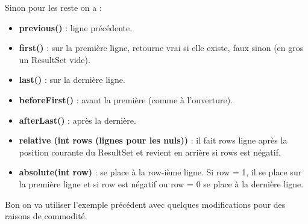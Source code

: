 \documentclass{report}
\begin{document}
Sinon pour les reste on a :
\begin{itemize}
\item \textbf{previous()} : ligne précédente.
\item \textbf{first()} : sur la première ligne, retourne vrai si elle existe, faux sinon (en gros un ResultSet vide).
\item \textbf{last()} : sur la dernière ligne.
\item \textbf{beforeFirst()} : avant la première (comme à l'ouverture).
\item \textbf{afterLast()} : après la dernière.
\item \textbf{relative (int rows (lignes pour les nuls))} : il fait rows ligne après la position courante du ResultSet et revient en arrière si rows est négatif.
\item \textbf{absolute(int row)} : se place à la row-ième ligne. Si row = 1, il se place sur la première ligne et si row est négatif ou row = 0 se place à la dernière ligne.\\
\end{itemize}
Bon on va utiliser l'exemple précédent avec quelques modifications pour des raisons de commodité.
\end{document}

